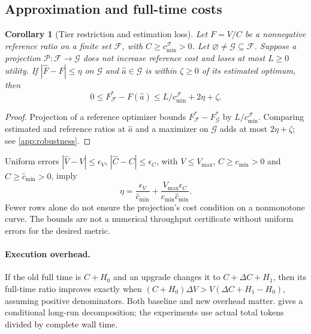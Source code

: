 \documentclass{article}
\newtheorem{corollary}[corollary]{Corollary}
\begin{document}
\subsection{Approximation and full-time costs}
\label{sec:errors}
\begin{corollary}[Tier restriction and estimation loss]
\label{cor:combined-gap}
Let $F=V/C$ be a nonnegative reference ratio on a finite set $\mathcal F$, with $C\ge c_{\min}^{\mathcal F}>0$. Let $\varnothing\ne\mathcal G\subseteq\mathcal F$. Suppose a projection $\mathcal P:\mathcal F\to\mathcal G$ does not increase reference cost and loses at most $L\ge0$ utility. If $|\widehat F-F|\le\eta$ on $\mathcal G$ and $\widehat a\in\mathcal G$ is within $\zeta\ge0$ of its estimated optimum, then
\begin{equation}
0\le F^*_{\mathcal F}-F(\widehat a)
\le L/c_{\min}^{\mathcal F}+2\eta+\zeta.
\label{eq:main-combined-gap}
\end{equation}
\end{corollary}
\begin{proof}
Projection of a reference optimizer bounds $F^*_{\mathcal F}-F^*_{\mathcal G}$ by $L/c_{\min}^{\mathcal F}$. Comparing estimated and reference ratios at $\widehat a$ and a maximizer on $\mathcal G$ adds at most $2\eta+\zeta$; see \cref{app:robustness}.
\end{proof}

Uniform errors $|\widehat V-V|\le\epsilon_V$, $|\widehat C-C|\le\epsilon_C$, with $V\le V_{\max}$, $C\ge c_{\min}>0$ and $\widehat C\ge\widehat c_{\min}>0$, imply
\begin{equation}
\eta=\frac{\epsilon_V}{\widehat c_{\min}}
+\frac{V_{\max}\epsilon_C}{c_{\min}\widehat c_{\min}}.
\label{eq:main-prediction-bound}
\end{equation}
Fewer rows alone do not ensure the projection's cost condition on a nonmonotone curve. The bounds are not a numerical throughput certificate without uniform errors for the desired metric.

\paragraph{Execution overhead.}
\label{sec:throughput-link}
If the old full time is $C+H_0$ and an upgrade changes it to $C+\Delta C+H_1$, then its full-time ratio improves exactly when $(C+H_0)\Delta V>V(\Delta C+H_1-H_0)$, assuming positive denominators. Both baseline and new overhead matter.  gives a conditional long-run decomposition; the experiments use actual total tokens divided by complete wall time.
\end{document}
